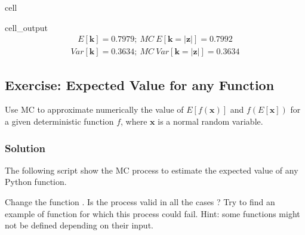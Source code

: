 \documentclass[letterpaper,10pt,english]{jupyterBook}
\begin{document}
\begin{sphinxuseclass}{cell}
\begin{sphinxVerbatimOutput}
\begin{sphinxuseclass}{cell_output}\begin{equation*}
\begin{split}\displaystyle E[\mathbf k] = 0.7979;\ MC\ E[\mathbf k=|\mathbf z|] = 0.7992\end{split}
\end{equation*}\begin{equation*}
\begin{split}\displaystyle Var[\mathbf k] = 0.3634;\ MC\ Var[\mathbf k=|\mathbf z|] = 0.3634\end{split}
\end{equation*}
\end{sphinxuseclass}\end{sphinxVerbatimOutput}

\end{sphinxuseclass}

\subsection{Exercise: Expected Value for any Function}
\label{\detokenize{01:exercise-expected-value-for-any-function}}
\sphinxAtStartPar
Use MC to approximate numerically the value of \(E[f({\mathbf x})]\) and \(f(E[{\mathbf x}])\) for a given deterministic function \(f\), where \({\mathbf x}\) is a normal random variable.


\subsubsection{Solution}
\label{\detokenize{01:id6}}
\sphinxAtStartPar
The following script show the MC process to estimate the expected value of any Python function.

\begin{sphinxShadowBox}
\sphinxstylesidebartitle{}

\sphinxAtStartPar
Change the function . Is the process valid in all the cases ? Try to find an example of function for which this process could fail. Hint: some functions might not be defined depending on their input.
\end{sphinxShadowBox}
\end{document}
